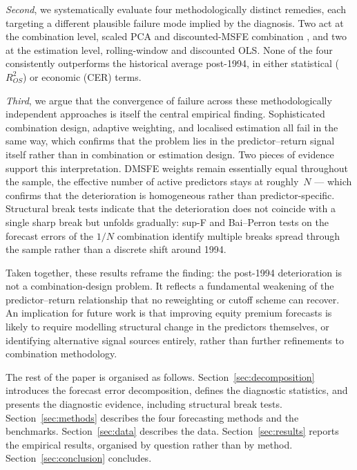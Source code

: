 \documentclass[a4paper,11pt]{article}
\begin{document}
\textit{Second}, we systematically evaluate four methodologically distinct
remedies, each targeting a different plausible failure mode implied by the
diagnosis. Two act at the combination level, scaled PCA
\citep[sPCA,][]{huang2022scale} and discounted-MSFE combination
\citep{StockWatson2004}, and two at the estimation level, rolling-window
and discounted OLS. None of the four consistently outperforms the
historical average post-1994, in either statistical ($R^{2}_{OS}$) or
economic (CER) terms.

\textit{Third}, we argue that the convergence of failure across these
methodologically independent approaches is itself the central empirical
finding. Sophisticated combination design, adaptive weighting, and
localised estimation all fail in the same way, which confirms that the
problem lies in the predictor--return signal itself rather than in
combination or estimation design. Two pieces of evidence support this
interpretation. DMSFE weights remain essentially equal throughout the
sample, the effective number of active predictors stays at roughly~$N$
--- which confirms that the deterioration is homogeneous rather than
predictor-specific. Structural break tests indicate that the deterioration
does not coincide with a single sharp break but unfolds gradually: sup-F
and Bai--Perron tests on the forecast errors of the $1/N$ combination
identify multiple breaks spread through the sample rather than a discrete
shift around 1994.

Taken together, these results reframe the \citet{denkloffler2024}
finding: the post-1994 deterioration is not a combination-design problem.
It reflects a fundamental weakening of the predictor--return relationship
that no reweighting or cutoff scheme can recover. An implication for
future work is that improving equity premium forecasts is likely to
require modelling structural change in the predictors themselves, or
identifying alternative signal sources entirely, rather than further
refinements to combination methodology.

The rest of the paper is organised as follows.
Section~\ref{sec:decomposition} introduces the forecast error
decomposition, defines the diagnostic statistics, and presents the
diagnostic evidence, including structural break tests.
Section~\ref{sec:methods} describes the four forecasting methods and the
benchmarks. Section~\ref{sec:data} describes the data.
Section~\ref{sec:results} reports the empirical results,
organised by question rather than by method.
Section~\ref{sec:conclusion} concludes.
\end{document}
